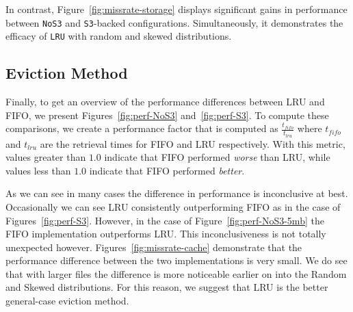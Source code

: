 In contrast, Figure~\ref{fig:missrate-storage} displays significant gains in
performance between {\tt NoS3} and {\tt S3}-backed configurations.
Simultaneously, it demonstrates the efficacy of {\tt LRU} with random and
skewed distributions.

\subsection{Eviction Method} %
Finally, to get an overview of the performance differences between LRU and
FIFO, we present Figures~\ref{fig:perf-NoS3} and~\ref{fig:perf-S3}. To compute
these comparisons, we create a performance factor that is computed as
$\frac{t_{fifo}}{t_{lru}}$ where $t_{fifo}$ and $t_{lru}$ are the retrieval
times for FIFO and LRU respectively. With this metric, values greater than
$1.0$ indicate that FIFO performed \emph{worse} than LRU, while values less
than $1.0$ indicate that FIFO performed \emph{better}.

As we can see in many cases the difference in performance is inconclusive at
best. Occasionally we can see LRU consistently outperforming FIFO as in the
case of Figures~\ref{fig:perf-S3}. However, in the case of
Figure~\ref{fig:perf-NoS3-5mb} the FIFO implementation outperforms LRU\@. This
inconclusiveness is not totally unexpected however.
Figures~\ref{fig:missrate-cache} demonstrate that the performance difference
between the two implementations is very small. We do see that with larger files
the difference is more noticeable earlier on into the Random and Skewed
distributions. For this reason, we suggest that LRU is the better general-case
eviction method.

